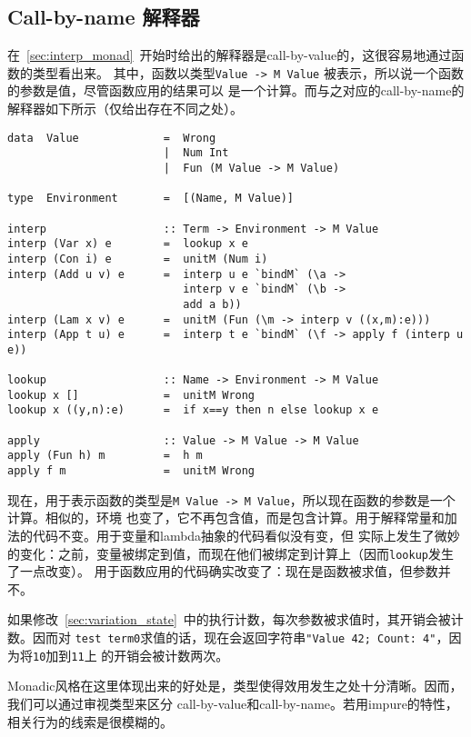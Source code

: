 \documentclass[12pt]{article}
\begin{document}
\subsection{Call-by-name 解释器}
\indent{}在~\ref{sec:interp_monad}~开始时给出的解释器是call-by-value的，这很容易地通过函数的类型看出来。
其中，函数以类型\texttt{Value -> M Value} 被表示，所以说一个函数的参数是值，尽管函数应用的结果可以
是一个计算。而与之对应的call-by-name的解释器如下所示（仅给出存在不同之处）。
\begin{verbatim}
data  Value             =  Wrong
                        |  Num Int
                        |  Fun (M Value -> M Value)

type  Environment       =  [(Name, M Value)]

interp                  :: Term -> Environment -> M Value
interp (Var x) e        =  lookup x e
interp (Con i) e        =  unitM (Num i)
interp (Add u v) e      =  interp u e `bindM` (\a ->
                           interp v e `bindM` (\b ->
                           add a b))
interp (Lam x v) e      =  unitM (Fun (\m -> interp v ((x,m):e)))
interp (App t u) e      =  interp t e `bindM` (\f -> apply f (interp u e))

lookup                  :: Name -> Environment -> M Value
lookup x []             =  unitM Wrong
lookup x ((y,n):e)      =  if x==y then n else lookup x e

apply                   :: Value -> M Value -> M Value
apply (Fun h) m         =  h m
apply f m               =  unitM Wrong
\end{verbatim}
\noindent{}现在，用于表示函数的类型是\texttt{M Value -> M Value}，所以现在函数的参数是一个计算。相似的，环境
也变了，它不再包含值，而是包含计算。用于解释常量和加法的代码不变。用于变量和lambda抽象的代码看似没有变，但
实际上发生了微妙的变化：之前，变量被绑定到值，而现在他们被绑定到计算上（因而\texttt{lookup}发生了一点改变）。
用于函数应用的代码确实改变了：现在是函数被求值，但参数并不。

\indent{}如果修改~\ref{sec:variation_state}~中的执行计数，每次参数被求值时，其开销会被计数。因而对
\texttt{test term0}求值的话，现在会返回字符串\texttt{"Value 42; Count: 4"}，因为将\texttt{10}加到\texttt{11}上
的开销会被计数两次。

\indent{}Monadic风格在这里体现出来的好处是，类型使得效用发生之处十分清晰。因而，我们可以通过审视类型来区分
call-by-value和call-by-name。若用impure的特性，相关行为的线索是很模糊的。
\end{document}
